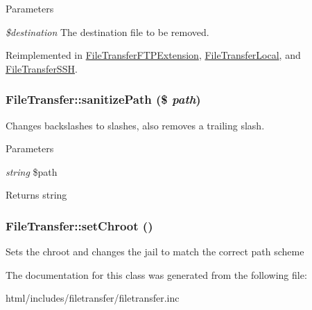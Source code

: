 \begin{DoxyParams}{Parameters}
\item[{\em \$destination}]The destination file to be removed. \end{DoxyParams}


Reimplemented in \hyperlink{classFileTransferFTPExtension_a60d622a655c4492a569b02d25d2aa376}{FileTransferFTPExtension}, \hyperlink{classFileTransferLocal_aa7e7102eef93d90da81df65bb2033d93}{FileTransferLocal}, and \hyperlink{classFileTransferSSH_aac364593d01d77780e3b22d76c778872}{FileTransferSSH}.\hypertarget{classFileTransfer_a66b62fbb6a66ffd8f9a986e85aefc98d}{
\subsubsection[{sanitizePath}]{\setlength{\rightskip}{0pt plus 5cm}FileTransfer::sanitizePath (\$ {\em path})}}
\label{classFileTransfer_a66b62fbb6a66ffd8f9a986e85aefc98d}
Changes backslashes to slashes, also removes a trailing slash.


\begin{DoxyParams}{Parameters}
\item[{\em string}]\$path \end{DoxyParams}
\begin{DoxyReturn}{Returns}
string 
\end{DoxyReturn}
\hypertarget{classFileTransfer_a09ee9c27162826be5c39d9db3494c1f2}{
\subsubsection[{setChroot}]{\setlength{\rightskip}{0pt plus 5cm}FileTransfer::setChroot ()}}
\label{classFileTransfer_a09ee9c27162826be5c39d9db3494c1f2}
Sets the chroot and changes the jail to match the correct path scheme 

The documentation for this class was generated from the following file:\begin{DoxyCompactItemize}
\item 
html/includes/filetransfer/filetransfer.inc\end{DoxyCompactItemize}
